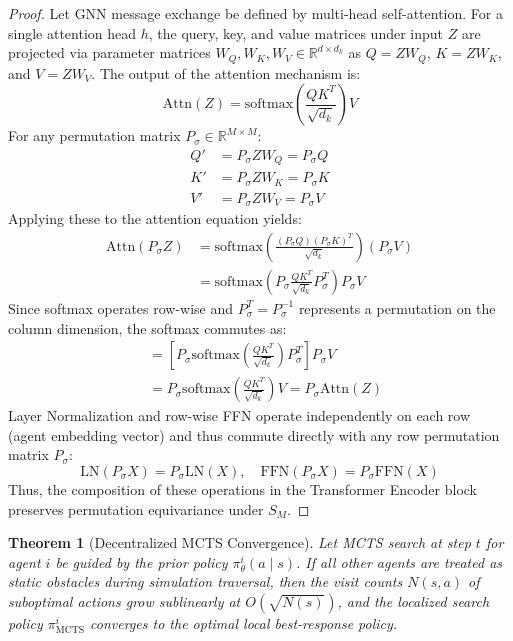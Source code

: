 \documentclass[11pt,a4paper]{article}
\newtheorem{theorem}{Theorem}
\begin{document}
\begin{proof}
Let GNN message exchange be defined by multi-head self-attention. For a single attention head $h$, the query, key, and value matrices under input $Z$ are projected via parameter matrices $W_Q, W_K, W_V \in \mathbb{R}^{d \times d_k}$ as $Q = Z W_Q$, $K = Z W_K$, and $V = Z W_V$.
The output of the attention mechanism is:
\begin{equation}
    \mathrm{Attn}(Z) = \mathrm{softmax}\left(\frac{Q K^T}{\sqrt{d_k}}\right) V
\end{equation}
For any permutation matrix $P_\sigma \in \mathbb{R}^{M \times M}$:
\begin{align*}
    Q' &= P_\sigma Z W_Q = P_\sigma Q \\
    K' &= P_\sigma Z W_K = P_\sigma K \\
    V' &= P_\sigma Z W_V = P_\sigma V
\end{align*}
Applying these to the attention equation yields:
\begin{align*}
    \mathrm{Attn}(P_\sigma Z) &= \mathrm{softmax}\left(\frac{(P_\sigma Q)(P_\sigma K)^T}{\sqrt{d_k}}\right) (P_\sigma V) \\
    &= \mathrm{softmax}\left(P_\sigma \frac{Q K^T}{\sqrt{d_k}} P_\sigma^T\right) P_\sigma V
\end{align*}
Since softmax operates row-wise and $P_\sigma^T = P_\sigma^{-1}$ represents a permutation on the column dimension, the softmax commutes as:
\begin{align*}
    &= \left[ P_\sigma \mathrm{softmax}\left(\frac{Q K^T}{\sqrt{d_k}}\right) P_\sigma^T \right] P_\sigma V \\
    &= P_\sigma \mathrm{softmax}\left(\frac{Q K^T}{\sqrt{d_k}}\right) V = P_\sigma \mathrm{Attn}(Z)
\end{align*}
Layer Normalization and row-wise FFN operate independently on each row (agent embedding vector) and thus commute directly with any row permutation matrix $P_\sigma$:
\begin{equation}
    \mathrm{LN}(P_\sigma X) = P_\sigma \mathrm{LN}(X), \quad \mathrm{FFN}(P_\sigma X) = P_\sigma \mathrm{FFN}(X)
\end{equation}
Thus, the composition of these operations in the Transformer Encoder block preserves permutation equivariance under $S_M$.
\end{proof}

\begin{theorem}[Decentralized MCTS Convergence]\label{thm:mcts_conv}
Let MCTS search at step $t$ for agent $i$ be guided by the prior policy $\pi_\theta^i(a \mid s)$. If all other agents are treated as static obstacles during simulation traversal, then the visit counts $N(s, a)$ of suboptimal actions grow sublinearly at $O(\sqrt{N(s)})$, and the localized search policy $\pi_{\mathrm{MCTS}}^i$ converges to the optimal local best-response policy.
\end{theorem}
\end{document}
